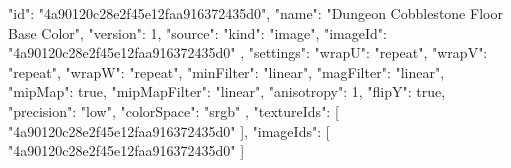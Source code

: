 {
  "id": "4a90120c28e2f45e12faa916372435d0",
  "name": "Dungeon Cobblestone Floor Base Color",
  "version": 1,
  "source": {
    "kind": "image",
    "imageId": "4a90120c28e2f45e12faa916372435d0"
  },
  "settings": {
    "wrapU": "repeat",
    "wrapV": "repeat",
    "wrapW": "repeat",
    "minFilter": "linear",
    "magFilter": "linear",
    "mipMap": true,
    "mipMapFilter": "linear",
    "anisotropy": 1,
    "flipY": true,
    "precision": "low",
    "colorSpace": "srgb"
  },
  "textureIds": [
    "4a90120c28e2f45e12faa916372435d0"
  ],
  "imageIds": [
    "4a90120c28e2f45e12faa916372435d0"
  ]
}
